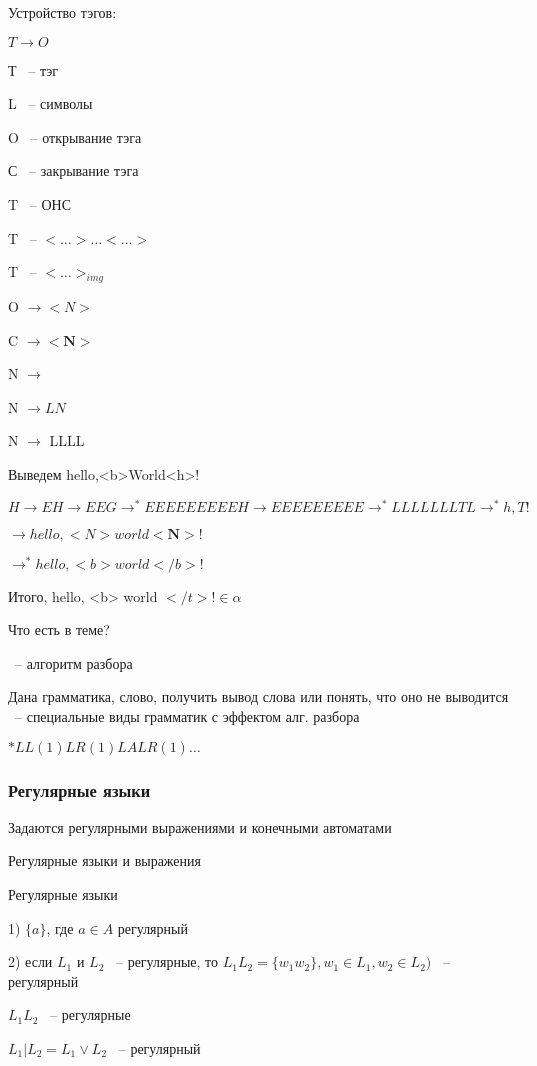 \documentclass[russian]{lecture-notes}
\begin{document}
	Устройство тэгов:

	$T \rightarrow O$

	Т ~-- тэг

	L ~-- символы

	O ~-- открывание тэга

	С ~-- закрывание тэга

	T ~-- ОНС

	T ~-- $< \dots > \dots <\dots>$

	T ~-- $< \dots >_{img}$

	O $\rightarrow <N>$

	C $\rightarrow <\mathbf{N}>$

	N $\rightarrow$

	N $\rightarrow LN$

	N $\rightarrow$ LLLL

	Выведем hello,<b>World<h>!

	$H \rightarrow EH \rightarrow EEG \rightarrow^{*} EEEEEEEEEH \rightarrow EEEEEEEEE \rightarrow^{*} LLLLLLLTL \rightarrow^{*} h,T!$

	$\rightarrow hello, <N> world <\mathbf{N}>!$

	$\rightarrow^{*} hello, <b> world </b>!$

	Итого, hello, <b> world $</t>! \in \alpha$

	Что есть в теме?

	~-- алгоритм разбора

		Дана грамматика, слово, получить вывод слова или понять, что оно не выводится ~-- специальные виды грамматик с эффектом алг. разбора

	$*LL(1) LR(1) LALR(1) \dots$

	\subsubsection{Регулярные языки}

	Задаются регулярными выражениями и конечными автоматами

	Регулярные языки и выражения

	\begin{definition}

		Регулярные языки

		1) $\{a\}$, где $a \in A$ регулярный

		2) если $L_{1}$ и $L_{2}$ ~-- регулярные, то $L_{1}L_{2} = \{w_{1}w_{2}\}, w_{1} \in L_{1}, w_{2} \in L_{2})$ ~-- регулярный

		$L_{1}L_{2}$ ~-- регулярные

		$L_{1}|L_{2} = L_{1} \lor L_{2}$ ~-- регулярный

		\end{definition}
\end{document}

